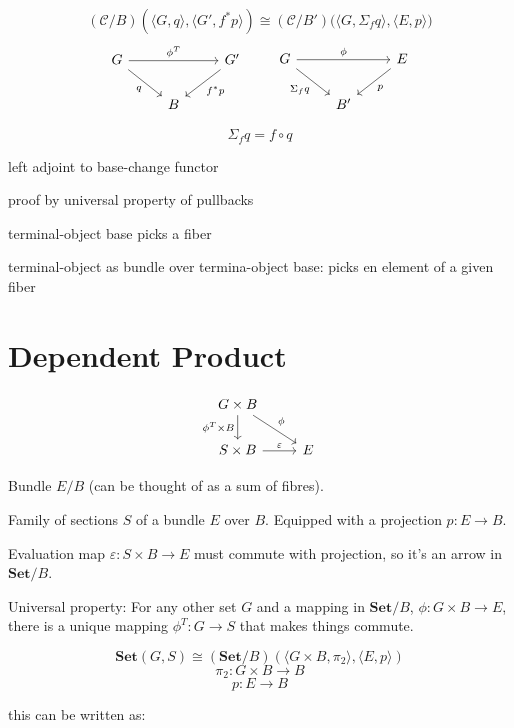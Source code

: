 \documentclass[DaoFP]{subfiles}
\begin{document}
\[  (\mathcal{C}/B) (\langle G, q \rangle , \langle G', f^* p\rangle ) \cong (\mathcal{C}/B') \big(\langle G, \Sigma_f q\rangle , \langle E, p\rangle \big) \]
\[
\begin{tikzcd}
 G
 \arrow[rr, "\phi^T"]
 \arrow[rd, "q"']
 && G'
 \arrow[ld, "f^* p"]
 \\
 & B
  \end{tikzcd}
 \hspace{20pt}
 \begin{tikzcd}
 G
 \arrow[rr, "\phi"]
 \arrow[rd, "\Sigma_f q"']
 &&E
 \arrow[dl, "p"]
 \\
 &B'
  \end{tikzcd}
\]

\[ \Sigma_f q = f \circ q \]




left adjoint to base-change functor

proof by universal property of pullbacks

terminal-object base picks a fiber

terminal-object as bundle over termina-object base: picks en element of a given fiber


\section{Dependent Product}

\[
 \begin{tikzcd}
 G \times B
 \arrow[d, "\phi^T \times B"']
 \arrow[dr, "\phi"]
 \\
 S \times B
 \arrow[r, "\varepsilon"]
 &E
  \end{tikzcd}
\]


Bundle $E/B$ (can be thought of as a sum of fibres).

Family of sections $S$ of a bundle $E$ over $B$. Equipped with a projection $p \colon E \to B$.

Evaluation map $\varepsilon \colon S \times B \to E$ must commute with projection, so it's an arrow in $\mathbf{Set}/B$.

Universal property: For any other set $G$ and a mapping in $\mathbf{Set}/B$,  $\phi \colon G \times B \to E$, there is a unique mapping $\phi^T \colon G \to S$ that makes things commute.

\[\mathbf{Set} (G, S) \cong (\mathbf{Set}/B)(\langle G\times B, \pi_2\rangle , \langle E, p\rangle ) \]
\[\pi_2 \colon G \times B \to B \]
\[p \colon E \to B \]

this can be written as:
\end{document}
